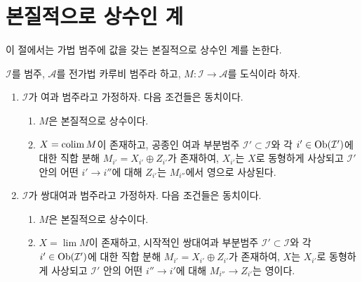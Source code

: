 \section{본질적으로 상수인 계}
\label{section-essentially-constant}

\noindent
이 절에서는 가법 범주에 값을 갖는 본질적으로 상수인 계를 논한다.

\begin{lemma}
\label{lemma-essentially-constant-into-karoubian}
$\mathcal{I}$를 범주, $\mathcal{A}$를 전가법 카루비 범주라 하고,
$M : \mathcal{I} \to \mathcal{A}$를 도식이라 하자.
\begin{enumerate}
\item $\mathcal{I}$가 여과 범주라고 가정하자. 다음 조건들은 동치이다.
\begin{enumerate}
\item $M$은 본질적으로 상수이다.
\item $X = \mathop{\mathrm{colim}}\nolimits M$이 존재하고, 공종인 여과 부분범주
$\mathcal{I}' \subset \mathcal{I}$와 각 $i' \in \mathop{\mathrm{Ob}}\nolimits(\mathcal{I}')$에
대한 직합 분해 $M_{i'} = X_{i'} \oplus Z_{i'}$가 존재하여,
$X_{i'}$는 $X$로 동형하게 사상되고 $\mathcal{I}'$ 안의 어떤
$i' \to i''$에 대해 $Z_{i'}$는 $M_{i''}$에서 영으로 사상된다.
\end{enumerate}
\item $\mathcal{I}$가 쌍대여과 범주라고 가정하자. 다음 조건들은 동치이다.
\begin{enumerate}
\item $M$은 본질적으로 상수이다.
\item $X = \lim M$이 존재하고, 시작적인 쌍대여과 부분범주
$\mathcal{I}' \subset \mathcal{I}$와 각 $i' \in \mathop{\mathrm{Ob}}\nolimits(\mathcal{I}')$에
대한 직합 분해 $M_{i'} = X_{i'} \oplus Z_{i'}$가 존재하여,
$X$는 $X_{i'}$로 동형하게 사상되고 $\mathcal{I}'$ 안의 어떤
$i'' \to i'$에 대해 $M_{i''} \to Z_{i'}$는 영이다.
\end{enumerate}
\end{enumerate}
\end{lemma}

